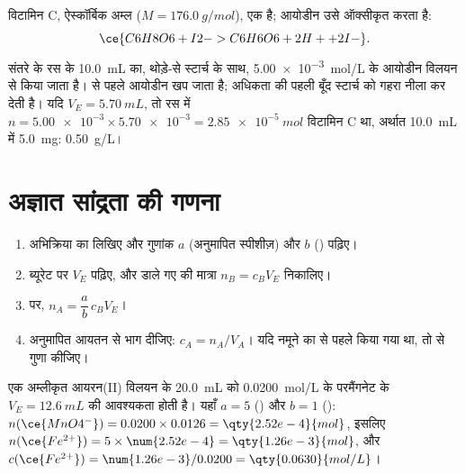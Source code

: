 \begin{example}[विटामिन C और आयोडीन]\label{ex:g11:titration:vitamin-c}
विटामिन C, ऐस्कॉर्बिक अम्ल  ($M = \qty{176.0}{g/mol}$), एक
 है; आयोडीन  उसे ऑक्सीकृत करता है:
\[
  \ce{C6H8O6 + I2 -> C6H6O6 + 2H+ + 2I-} .
\]
संतरे के रस के \qty{10.0}{mL} का, थोड़े-से स्टार्च के साथ,
\qty{5.00e-3}{mol/L} के आयोडीन विलयन से  किया जाता है।  से पहले आयोडीन
खप जाता है; अधिकता की पहली बूँद स्टार्च को गहरा नीला कर देती है। यदि
$V_E = \qty{5.70}{mL}$, तो रस में
$n = \num{5.00e-3} \times \num{5.70e-3} = \qty{2.85e-5}{mol}$ विटामिन
C था, अर्थात \qty{10.0}{mL} में \qty{5.0}{mg}: \qty{0.50}{g/L}।
\end{example}

\section{अज्ञात सांद्रता की गणना}

\begin{method}[अनुमापन से सांद्रता की गणना]\label{met:g11:titration:computing}
\begin{enumerate}
  \item {} अभिक्रिया का  लिखिए और
        गुणांक $a$ (अनुमापित स्पीशीज़) और $b$ () पढ़िए।
  \item ब्यूरेट पर $V_E$ पढ़िए, और डाले गए  की मात्रा
        $n_B = c_B V_E$ निकालिए।
  \item {} पर, $n_A = \dfrac{a}{b}\, c_B V_E$।
  \item अनुमापित आयतन से भाग दीजिए: $c_A = n_A / V_A$। यदि नमूने का
         से पहले  किया गया था, तो  से गुणा कीजिए।
\end{enumerate}
\end{method}

\begin{example}\label{ex:g11:titration:iron}
एक अम्लीकृत आयरन(II) विलयन के \qty{20.0}{mL} को \qty{0.0200}{mol/L} के परमैंगनेट के
$V_E = \qty{12.6}{mL}$ की आवश्यकता होती है। यहाँ
$a = 5$ () और $b = 1$ ():
$n(\ce{MnO4^-}) = 0.0200 \times 0.0126 = \qty{2.52e-4}{mol}$, इसलिए
$n(\ce{Fe^{2+}}) = 5 \times \num{2.52e-4} = \qty{1.26e-3}{mol}$, और
$c(\ce{Fe^{2+}}) = \num{1.26e-3} / 0.0200 = \qty{0.0630}{mol/L}$।
\end{example}

